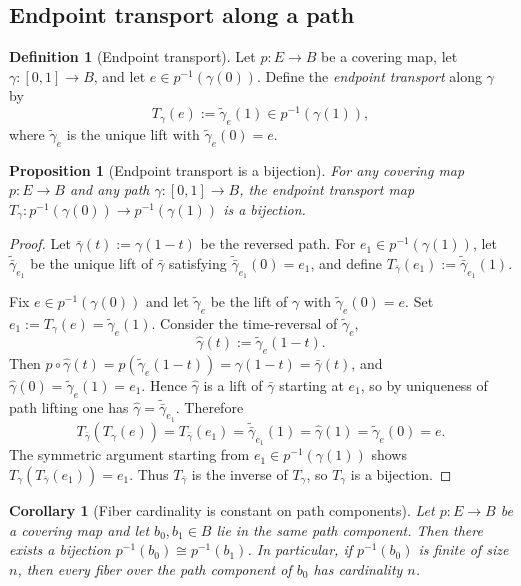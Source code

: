 \documentclass[11pt,a4paper]{article}
\newtheorem{proposition}[theorem]{Proposition}
\newtheorem{corollary}[theorem]{Corollary}
\theoremstyle{definition}
\newtheorem{definition}[theorem]{Definition}
\theoremstyle{remark}
\begin{document}
\subsection{Endpoint transport along a path}
\label{sec:endpoint-transport}

\begin{definition}[Endpoint transport]
\label{def:endpoint-transport}
Let \(p:E\to B\) be a covering map, let \(\gamma:[0,1]\to B\), and let \(e\in p^{-1}(\gamma(0))\). Define the \emph{endpoint transport} along \(\gamma\) by
\[
T_\gamma(e):=\tilde\gamma_e(1)\in p^{-1}(\gamma(1)),
\]
where \(\tilde\gamma_e\) is the unique lift with \(\tilde\gamma_e(0)=e\).
\end{definition}

\begin{proposition}[Endpoint transport is a bijection]
\label{prop:endpoint-bijection}
For any covering map \(p:E\to B\) and any path \(\gamma:[0,1]\to B\), the endpoint transport map
\(
T_\gamma:p^{-1}(\gamma(0))\to p^{-1}(\gamma(1))
\)
is a bijection.
\end{proposition}

\begin{proof}
Let \(\bar\gamma(t):=\gamma(1-t)\) be the reversed path. For \(e_1\in p^{-1}(\gamma(1))\), let \(\widetilde{\bar\gamma}_{e_1}\) be the unique lift of \(\bar\gamma\) satisfying \(\widetilde{\bar\gamma}_{e_1}(0)=e_1\), and define \(T_{\bar\gamma}(e_1):=\widetilde{\bar\gamma}_{e_1}(1)\).

Fix \(e\in p^{-1}(\gamma(0))\) and let \(\tilde\gamma_e\) be the lift of \(\gamma\) with \(\tilde\gamma_e(0)=e\). Set \(e_1:=T_\gamma(e)=\tilde\gamma_e(1)\). Consider the time-reversal of \(\tilde\gamma_e\),
\[
\hat\gamma(t):=\tilde\gamma_e(1-t).
\]
Then \(p\circ \hat\gamma(t)=p(\tilde\gamma_e(1-t))=\gamma(1-t)=\bar\gamma(t)\), and \(\hat\gamma(0)=\tilde\gamma_e(1)=e_1\). Hence \(\hat\gamma\) is a lift of \(\bar\gamma\) starting at \(e_1\), so by uniqueness of path lifting one has \(\hat\gamma=\widetilde{\bar\gamma}_{e_1}\). Therefore
\[
T_{\bar\gamma}(T_\gamma(e))=T_{\bar\gamma}(e_1)=\widetilde{\bar\gamma}_{e_1}(1)=\hat\gamma(1)=\tilde\gamma_e(0)=e.
\]
The symmetric argument starting from \(e_1\in p^{-1}(\gamma(1))\) shows \(T_\gamma(T_{\bar\gamma}(e_1))=e_1\). Thus \(T_{\bar\gamma}\) is the inverse of \(T_\gamma\), so \(T_\gamma\) is a bijection.
\end{proof}

\begin{corollary}[Fiber cardinality is constant on path components]
\label{cor:fiber-cardinality-constant}
Let \(p:E\to B\) be a covering map and let \(b_0,b_1\in B\) lie in the same path component. Then there exists a bijection \(p^{-1}(b_0)\cong p^{-1}(b_1)\). In particular, if \(p^{-1}(b_0)\) is finite of size \(n\), then every fiber over the path component of \(b_0\) has cardinality \(n\).
\end{corollary}
\end{document}
